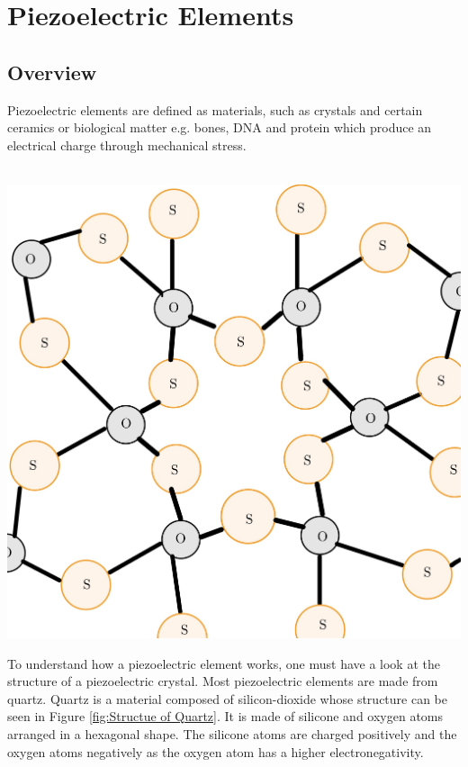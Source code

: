 \chapter{Piezoelectric Elements}

\section{Overview}

Piezoelectric elements are defined as materials, such as crystals and certain ceramics or biological matter e.g. bones, DNA and protein which produce an electrical charge through mechanical stress.\cite{Wikipedia2023} \\
\\
\begin{minipage}{0.33\textwidth}
    \includegraphics[width=\textwidth]{./Figure_1.jpg}
    \label{fig:Structue of Quartz}
\end{minipage}
\begin{minipage}{0.66\textwidth}
    To understand how a piezoelectric element works, one must have a look at the structure of a piezoelectric crystal. Most piezoelectric elements are made from quartz. Quartz is a material composed of silicon-dioxide whose structure can be seen in Figure \ref{fig:Structue of Quartz}. It is made of silicone and oxygen atoms arranged in a hexagonal shape. The silicone atoms are charged positively and the oxygen atoms negatively as the oxygen atom has a higher electronegativity.\cite{Mould2019}\\
\end{minipage}
